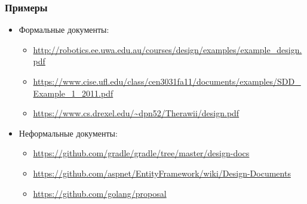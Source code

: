 \documentclass[xetex,mathserif,serif]{beamer}
\begin{document}
	\begin{frame}
		\frametitle{Примеры}
		\begin{itemize}
			\item Формальные документы:
			\begin{itemize}
				\item \url{http://robotics.ee.uwa.edu.au/courses/design/examples/example\_design.pdf}
				\item \url{https://www.cise.ufl.edu/class/cen3031fa11/documents/examples/SDD\_Example\_1\_2011.pdf}
				\item \url{https://www.cs.drexel.edu/~dpn52/Therawii/design.pdf}
			\end{itemize}
			\item Неформальные документы:
			\begin{itemize}
				\item \url{https://github.com/gradle/gradle/tree/master/design-docs}
				\item \url{https://github.com/aspnet/EntityFramework/wiki/Design-Documents}
				\item \url{https://github.com/golang/proposal}
			\end{itemize}
		\end{itemize}
	\end{frame}
\end{document}
